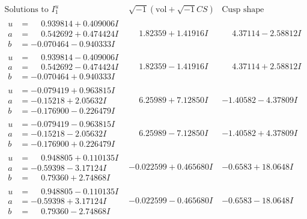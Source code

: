 \documentclass[1p]{elsarticle_modified}
\theoremstyle{definition}
\newcommand{\I}{\sqrt{-1}}
\begin{document}
$$\begin{array}{c|c|c}  
\text{Solutions to }I^u_{1}& \I (\text{vol} + \sqrt{-1}CS) & \text{Cusp shape}\\
 \hline 
\begin{aligned}
u &= \phantom{-}0.939814 + 0.409006 I \\
a &= \phantom{-}0.542692 + 0.474424 I \\
b &= -0.070464 - 0.940333 I\end{aligned}
 & \phantom{-}1.82359 + 1.41916 I & \phantom{-}4.37114 - 2.58812 I \\ \hline\begin{aligned}
u &= \phantom{-}0.939814 - 0.409006 I \\
a &= \phantom{-}0.542692 - 0.474424 I \\
b &= -0.070464 + 0.940333 I\end{aligned}
 & \phantom{-}1.82359 - 1.41916 I & \phantom{-}4.37114 + 2.58812 I \\ \hline\begin{aligned}
u &= -0.079419 + 0.963815 I \\
a &= -0.15218 + 2.05632 I \\
b &= -0.176900 - 0.226479 I\end{aligned}
 & \phantom{-}6.25989 + 7.12850 I & -1.40582 - 4.37809 I \\ \hline\begin{aligned}
u &= -0.079419 - 0.963815 I \\
a &= -0.15218 - 2.05632 I \\
b &= -0.176900 + 0.226479 I\end{aligned}
 & \phantom{-}6.25989 - 7.12850 I & -1.40582 + 4.37809 I \\ \hline\begin{aligned}
u &= \phantom{-}0.948805 + 0.110135 I \\
a &= -0.59398 - 3.17124 I \\
b &= \phantom{-}0.79360 + 2.74868 I\end{aligned}
 & -0.022599 + 0.465680 I & -0.6583 + 18.0648 I \\ \hline\begin{aligned}
u &= \phantom{-}0.948805 - 0.110135 I \\
a &= -0.59398 + 3.17124 I \\
b &= \phantom{-}0.79360 - 2.74868 I\end{aligned}
 & -0.022599 - 0.465680 I & -0.6583 - 18.0648 I \\ \hline\begin{aligned}

\end{aligned}
\end{array}$$
\end{document}

